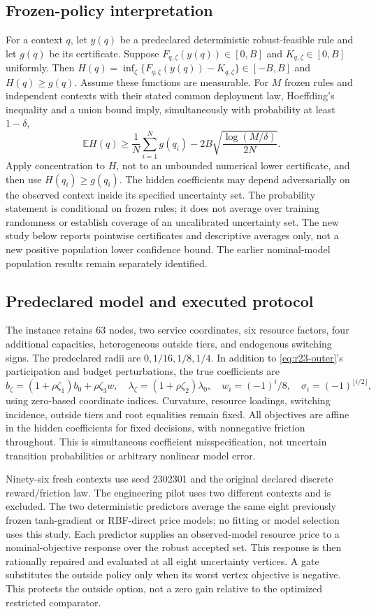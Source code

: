 \documentclass[11pt,letterpaper]{article}
\theoremstyle{definition}
\newcommand{\E}{\mathbb E}
\newcommand{\1}{\mathbf 1}
\begin{document}
\subsection{Frozen-policy interpretation}
For a context $q$, let $y(q)$ be a predeclared deterministic robust-feasible rule and let $g(q)$ be its certificate. Suppose $F_{q,\zeta}(y(q))\in[0,B]$ and $K_{q,\zeta}\in[0,B]$ uniformly. Then $H(q)=\inf_\zeta\{F_{q,\zeta}(y(q))-K_{q,\zeta}\}\in[-B,B]$ and $H(q)\geq g(q)$. Assume these functions are measurable. For $M$ frozen rules and independent contexts with their stated common deployment law, Hoeffding's inequality and a union bound imply, simultaneously with probability at least $1-\delta$,
\[
 \E H(q)\geq\frac1N\sum_{i=1}^N g(q_i)
       -2B\sqrt{\frac{\log(M/\delta)}{2N}}.
\]
Apply concentration to $H$, not to an unbounded numerical lower certificate, and then use $H(q_i)\geq g(q_i)$. The hidden coefficients may depend adversarially on the observed context inside its specified uncertainty set. The probability statement is conditional on frozen rules; it does not average over training randomness or establish coverage of an uncalibrated uncertainty set. The new study below reports pointwise certificates and descriptive averages only, not a new positive population lower confidence bound. The earlier nominal-model population results remain separately identified.

\subsection{Predeclared model and executed protocol}
The instance retains 63 nodes, two service coordinates, six resource factors, four additional capacities, heterogeneous outside tiers, and endogenous switching signs. The predeclared radii are $0,1/16,1/8,1/4$. In addition to \eqref{eq:r23-outer}'s participation and budget perturbations, the true coefficients are
\[
 b_\zeta=(1+\rho\zeta_1)b_0+\rho\zeta_3w,\quad
 \lambda_\zeta=(1+\rho\zeta_2)\lambda_0,\quad
 w_i=(-1)^i/8,\quad \sigma_i=(-1)^{\lfloor i/2\rfloor},
\]
using zero-based coordinate indices. Curvature, resource loadings, switching incidence, outside tiers and root equalities remain fixed. All objectives are affine in the hidden coefficients for fixed decisions, with nonnegative friction throughout. This is simultaneous coefficient misspecification, not uncertain transition probabilities or arbitrary nonlinear model error.

Ninety-six fresh contexts use seed 2302301 and the original declared discrete reward/friction law. The engineering pilot uses two different contexts and is excluded. The two deterministic predictors average the same eight previously frozen tanh-gradient or RBF-direct price models; no fitting or model selection uses this study. Each predictor supplies an observed-model resource price to a nominal-objective response over the robust accepted set. This response is then rationally repaired and evaluated at all eight uncertainty vertices. A gate substitutes the outside policy only when its worst vertex objective is negative. This protects the outside option, not a zero gain relative to the optimized restricted comparator.
\end{document}
